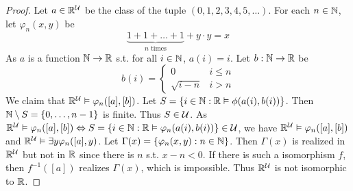 \documentclass[11pt]{article}
\begin{document}
\begin{proof}
Let \(a\in\mathbb{R}^{\mathcal{U}}\) be the class of the tuple \((0,1,2,3,4,5,\dots)\). For each \(n\in\mathbb{N}\), let \(\varphi_n(x,y)\) be
\begin{equation*}
\underbrace{1+1+\dots+1}_{n\text{ times}}+y\cdot y=x
\end{equation*}
As \(a\) is a function \(\mathbb{N}\to \mathbb{R}\) s.t. for all \(i\in\mathbb{N}\), \(a(i)=i\). Let \(b:\mathbb{N}\to\mathbb{R}\) be
\begin{equation*}
b(i)=
\begin{cases}
0&i\le n\\
\sqrt{i-n}&i>n
\end{cases}
\end{equation*}
We claim that \(\mathbb{R}^{\mathcal{U}}\vDash\varphi_n([a],[b])\). Let \(S=\{i\in\mathbb{N}:\mathbb{R}\vDash\phi(a(i),b(i))\}\). Then \(\mathbb{N}\setminus S=\{0,\dots,n-1\}\) is
finite. Thus \(S\in\mathcal{U}\). As \(\mathbb{R}^{\mathcal{U}}\vDash\varphi_n([a],[b])\Leftrightarrow S=\{i\in\mathbb{N}:\mathbb{R}\vDash\varphi_n(a(i),b(i))\}\in\mathcal{U}\), we
have \(\mathbb{R}^{\mathcal{U}}\vDash\varphi_n([a],[b])\) and \(\mathbb{R}^{\mathcal{U}}\vDash\exists y\varphi_n([a],y)\). Let \(\Gamma(x)=\{\varphi_n(x,y):n\in\mathbb{N}\}\). Then \(\Gamma(x)\)
is realized in \(\mathbb{R}^{\mathcal{U}}\) but not in \(\mathbb{R}\) since there is \(n\) s.t. \(x-n<0\). If there is such a
isomorphism \(f\), then \(f^{-1}([a])\) realizes \(\Gamma(x)\), which is impossible. Thus \(\mathbb{R}^{\mathcal{U}}\) is
not isomorphic to \(\mathbb{R}\).
\end{proof}
\end{document}
